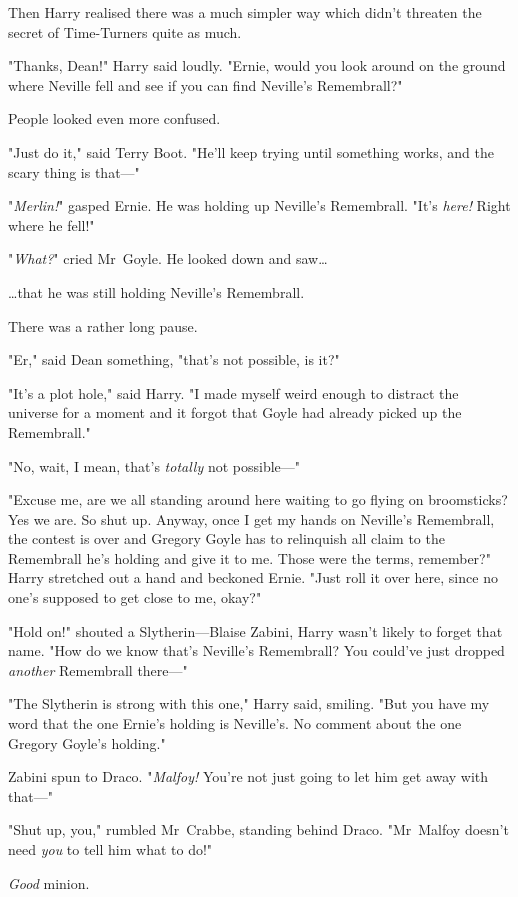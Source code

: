 Then Harry realised there was a much simpler way which didn’t threaten the
secret of Time-Turners quite as much.

"Thanks, Dean!" Harry said loudly. "Ernie, would you look around on the ground
where Neville fell and see if you can find Neville’s Remembrall?"

People looked even more confused.

"Just do it," said Terry Boot. "He’ll keep trying until something works, and
the scary thing is that—"

"\emph{Merlin!}" gasped Ernie. He was holding up Neville’s Remembrall. "It’s
\emph{here!} Right where he fell!"

"\emph{What?}" cried Mr~Goyle. He looked down and saw…

…that he was still holding Neville’s Remembrall.

There was a rather long pause.

"Er," said Dean something, "that’s not possible, is it?"

"It’s a plot hole," said Harry. "I made myself weird enough to distract the
universe for a moment and it forgot that Goyle had already picked up the
Remembrall."

"No, wait, I mean, that’s \emph{totally} not possible—"

"Excuse me, are we all standing around here waiting to go flying on
broomsticks? Yes we are. So shut up. Anyway, once I get my hands on Neville’s
Remembrall, the contest is over and Gregory Goyle has to relinquish all claim
to the Remembrall he’s holding and give it to me. Those were the terms,
remember?" Harry stretched out a hand and beckoned Ernie. "Just roll it over
here, since no one’s supposed to get close to me, okay?"

"Hold on!" shouted a Slytherin—Blaise Zabini, Harry wasn’t likely to forget
that name. "How do we know that’s Neville’s Remembrall? You could’ve just
dropped \emph{another} Remembrall there—"

"The Slytherin is strong with this one," Harry said, smiling. "But you have my
word that the one Ernie’s holding is Neville’s. No comment about the one
Gregory Goyle’s holding."

Zabini spun to Draco. "\emph{Malfoy!} You’re not just going to let him get away
with that—"

"Shut up, you," rumbled Mr~Crabbe, standing behind Draco. "Mr~Malfoy doesn’t
need \emph{you} to tell him what to do!"

\emph{Good} minion.

